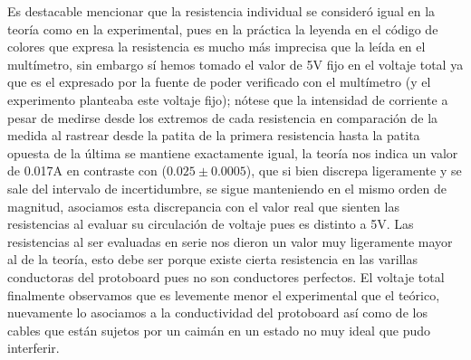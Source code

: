 \documentclass[article,12pt]{elsarticle}
\begin{document}
Es destacable mencionar que la resistencia individual se consideró igual en la teoría como en la experimental, pues en la práctica la leyenda en el código de colores que expresa la resistencia es mucho más imprecisa que la leída en el multímetro, sin embargo sí hemos tomado el valor de 5V fijo en el voltaje total ya que es el expresado por la fuente de poder verificado con el multímetro (y el experimento planteaba este voltaje fijo); nótese que la intensidad de corriente a pesar de medirse desde los extremos de cada resistencia en comparación de la medida al rastrear desde la patita de la primera resistencia hasta la patita opuesta de la última se mantiene exactamente igual, la teoría nos indica un valor de 0.017A en contraste con ($0.025 \pm 0.0005$), que si bien discrepa ligeramente y se sale del intervalo de incertidumbre, se sigue manteniendo en el mismo orden de magnitud, asociamos esta discrepancia con el valor real que sienten las resistencias al evaluar su circulación de voltaje pues es distinto a 5V. Las resistencias al ser evaluadas en serie nos dieron un valor muy ligeramente mayor al de la teoría, esto debe ser porque existe cierta resistencia en las varillas conductoras del protoboard pues no son conductores perfectos. El voltaje total finalmente observamos que es levemente menor el experimental que el teórico, nuevamente lo asociamos a la conductividad del protoboard así como de los cables que están sujetos por un caimán en un estado no muy ideal que pudo interferir.\\
\end{document}
